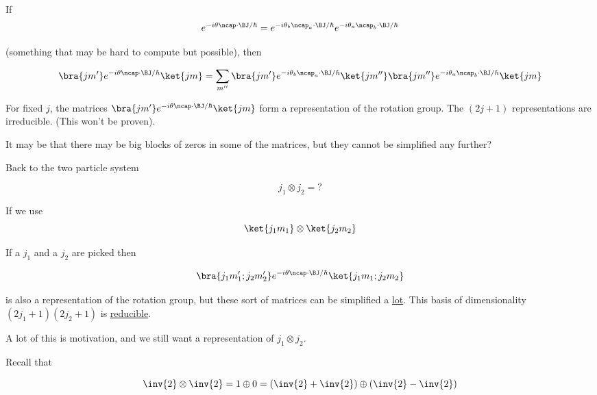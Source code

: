 If
\begin{equation}\label{eqn:qmTwoL17:260}
e^{-i \theta \ncap \cdot \BJ/\hbar}
=
e^{-i \theta_b \ncap_a \cdot \BJ/\hbar}
e^{-i \theta_a \ncap_b \cdot \BJ/\hbar}
\end{equation}

(something that may be hard to compute but possible), then

\begin{equation}\label{eqn:qmTwoL17:280}
\bra{j m'} e^{-i \theta \ncap \cdot \BJ/\hbar} \ket{j m}
=
\sum_{m''}
\bra{j m'} 
e^{-i \theta_b \ncap_a \cdot \BJ/\hbar}
\ket{j m''} \bra{j m''}
e^{-i \theta_a \ncap_b \cdot \BJ/\hbar}
 \ket{j m}
\end{equation}

For fixed $j$, the matrices $\bra{j m'} e^{-i \theta \ncap \cdot \BJ/\hbar} \ket{j m}$ form a representation of the rotation group.  The $(2 j + 1)$ representations are irreducible.  (This won't be proven).

It may be that there may be big blocks of zeros in some of the matrices, but they cannot be simplified any further?

Back to the two particle system

\begin{equation}\label{eqn:qmTwoL17:300}
j_1 \otimes j_2 = ?
\end{equation}

If we use
\begin{equation}\label{eqn:qmTwoL17:320}
\ket{j_1 m_1} \otimes \ket{j_2 m_2}
\end{equation}

If a $j_1$ and a $j_2$ are picked then

\begin{equation}\label{eqn:qmTwoL17:340}
\bra{j_1 m_1' ; j_2 m_2'} e^{-i \theta \ncap \cdot \BJ/\hbar} \ket{j_1 m_1 ; j_2 m_2}
\end{equation}

is also a representation of the rotation group, but these sort of matrices can be simplified a \underline{lot}.  This basis of dimensionality $(2 j_1 + 1)(2 j_2 + 1)$ is \underline{reducible}.

A lot of this is motivation, and we still want a representation of $j_1 \otimes j_2$.

Recall that 

\begin{equation}\label{eqn:qmTwoL17:360}
\inv{2} \otimes \inv{2} = 1 \oplus 0
= 
\left(\inv{2} + \inv{2} \right)
 \oplus 
\left(\inv{2} - \inv{2} \right)
\end{equation}

